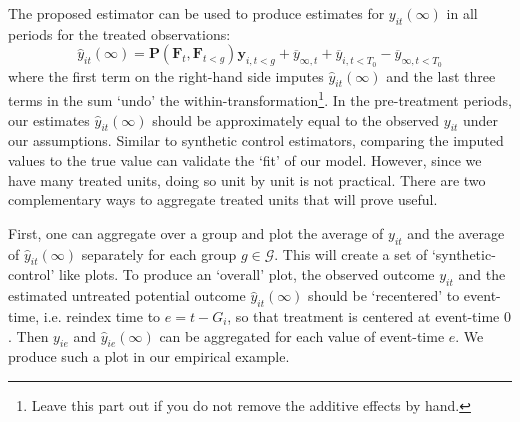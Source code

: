 \begin{remark}\label{sec:plotting_estimates}

The proposed estimator can be used to produce estimates for $y_{it}(\infty)$ in all periods for the treated observations:
\begin{equation}
  \hat{y}_{it}(\infty) = \bm P(\bm{F}_t, \bm{F}_{t < g}) \bm y_{i, t<g} + \overline{y}_{\infty, t} + \overline{y}_{i, t<T_0} - \overline{y}_{\infty, t<T_0}
\end{equation}
where the first term on the right-hand side imputes $\hat{y}_{it}(\infty)$ and the last three terms in the sum `undo' the within-transformation\footnote{Leave this part out if you do not remove the additive effects by hand.}. In the pre-treatment periods, our estimates $\hat{y}_{it}(\infty)$ should be approximately equal to the observed $y_{it}$ under our assumptions. Similar to synthetic control estimators, comparing the imputed values to the true value can validate the `fit' of our model. However, since we have many treated units, doing so unit by unit is not practical. There are two complementary ways to aggregate treated units that will prove useful. 

First, one can aggregate over a group and plot the average of $y_{it}$ and the average of $\hat{y}_{it}(\infty)$ separately for each group $g \in \mathcal{G}$. This will create a set of `synthetic-control' like plots. To produce an `overall' plot, the observed outcome $y_{it}$ and the estimated untreated potential outcome $\hat{y}_{it}(\infty)$ should be `recentered' to event-time, i.e. reindex time to $e = t - G_i$, so that treatment is centered at event-time $0$. Then $y_{ie}$ and $\hat{y}_{ie}(\infty)$ can be aggregated for each value of event-time $e$. We produce such a plot in our empirical example.

\end{remark}

